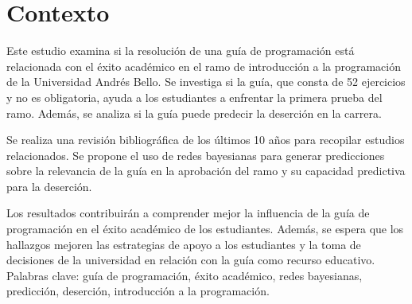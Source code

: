 \hypertarget{contexto}{%
    \section{Contexto}\label{contexto}}
    \vfill
Este estudio examina si la resolución de una guía de programación está relacionada con el éxito
académico en el ramo de introducción a la programación de la Universidad Andrés Bello. Se investiga
si la guía, que consta de 52 ejercicios y no es obligatoria, ayuda a los estudiantes a enfrentar la
primera prueba del ramo. Además, se analiza si la guía puede predecir la deserción en la carrera.

Se realiza una revisión bibliográfica de los últimos 10 años para recopilar estudios relacionados.
Se propone el uso de redes bayesianas para generar predicciones sobre la relevancia de la guía
en la aprobación del ramo y su capacidad predictiva para la deserción.

Los resultados contribuirán a comprender mejor la influencia de la guía de programación
en el éxito académico de los estudiantes. Además, se espera que los hallazgos mejoren
las estrategias de apoyo a los estudiantes y la toma de decisiones de la universidad
en relación con la guía como recurso educativo.
\vfill
Palabras clave: guía de programación, éxito académico, redes bayesianas, predicción, deserción, introducción a la programación.
\vfill